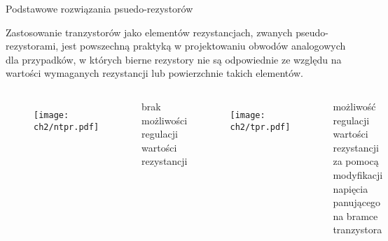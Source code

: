 



\begin{frame}{Podstawowe rozwiązania psuedo-rezystorów}
    \vspace{-1em}
    \begin{block}{}
        Zastosowanie tranzystorów jako elementów rezystancjach, zwanych pseudo-rezystorami, jest powszechną praktyką w projektowaniu obwodów analogowych dla przypadków, w których bierne rezystory nie są odpowiednie ze względu na wartości wymaganych rezystancji lub powierzchnie takich elementów. 
       \end{block}
    \begin{columns}
        \vspace{-2em}
        \begin{figure}[H]
            \texttt{[image: ch2/ntpr.pdf]}
        \end{figure}
        \begin{alertblock}{}
            brak możliwości regulacji wartości rezystancji
        \end{alertblock}



        \begin{figure}[H]
            \texttt{[image: ch2/tpr.pdf]}
        \end{figure}
        \vspace{-1em}
        \begin{exampleblock}{}
            możliwość regulacji wartości rezystancji za pomocą modyfikacji napięcia panującego na bramce tranzystora
        \end{exampleblock}

    \end{columns}
\end{frame}









        



